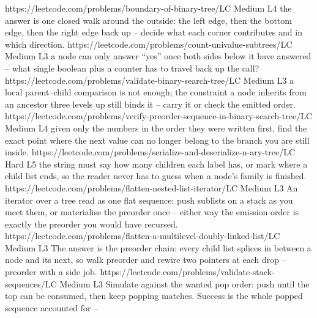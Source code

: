\begin{mixedset}
    {https://leetcode.com/problems/boundary-of-binary-tree/}{LC Medium L4}
    {the answer is one closed walk around the outside: the left edge, then the bottom
    edge, then the right edge back up -- decide what each corner contributes and in
    which direction.}
    {https://leetcode.com/problems/count-univalue-subtrees/}{LC Medium L3}
    {a node can only answer ``yes'' once both sides below it have answered -- what single
    boolean plus a counter has to travel back up the call?}
    {https://leetcode.com/problems/validate-binary-search-tree/}{LC Medium L3}
    {a local parent--child comparison is not enough; the constraint a node inherits from
    an ancestor three levels up still binds it -- carry it or check the emitted order.}
    {https://leetcode.com/problems/verify-preorder-sequence-in-binary-search-tree/}{LC Medium L4}
    {given only the numbers in the order they were written first, find the exact point
    where the next value can no longer belong to the branch you are still inside.}
    {https://leetcode.com/problems/serialize-and-deserialize-n-ary-tree/}{LC Hard L5}
    {the string must say how many children each label has, or mark where a child list
    ends, so the reader never has to guess when a node's family is finished.}
    {https://leetcode.com/problems/flatten-nested-list-iterator/}{LC Medium L3}
    {An iterator over a tree read as one flat sequence: push sublists on a stack as
    you meet them, or materialise the preorder once -- either way the emission order
    is exactly the preorder you would have recursed.}
    {https://leetcode.com/problems/flatten-a-multilevel-doubly-linked-list/}{LC Medium L3}
    {The answer is the preorder chain: every child list splices in between a node and
    its next, so walk preorder and rewire two pointers at each drop -- preorder with
    a side job.}
    {https://leetcode.com/problems/validate-stack-sequences/}{LC Medium L3}
    {Simulate against the wanted pop order: push until the top can be consumed, then
    keep popping matches. Success is the whole popped sequence accounted for --
}
\end{mixedset}
